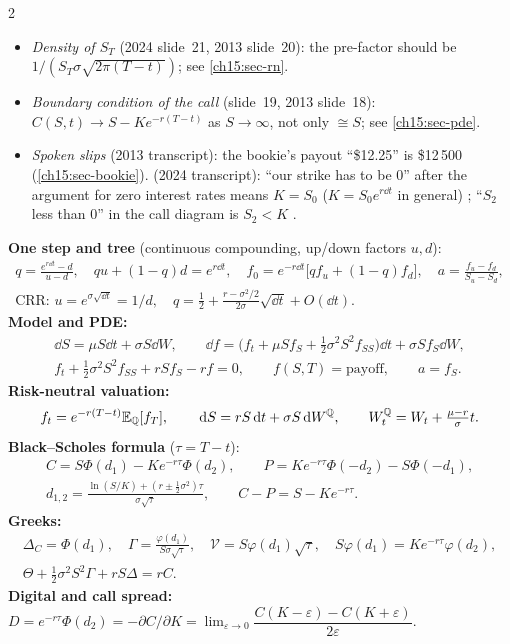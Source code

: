 \begin{paracol}{2}
\begin{coursenote}
\begin{itemize}
  \item \emph{Density of $S_T$} (2024 slide~21, 2013 slide~20): the pre-factor should be $1/(S_T\sigma\sqrt{2\pi(T-t)})$; see \cref{ch15:sec-rn}.
  \item \emph{Boundary condition of the call} (slide~19, 2013 slide~18): $C(S,t)\to S-Ke^{-r(T-t)}$ as $S\to\infty$, not only $\cong S$; see \cref{ch15:sec-pde}.
  \item \emph{Spoken slips} (2013 transcript): the bookie's payout ``\$12.25'' is \$12\,500 (\cref{ch15:sec-bookie}). (2024 transcript): ``our strike has to be 0'' after the argument for zero interest rates means $K=S_0$ ($K=S_0e^{r\dd t}$ in general) ;
        ``$S_2$ less than 0'' in the call diagram is $S_2<K$ .
\end{itemize}
\end{coursenote}

\begin{keyformulas}
\textbf{One step and tree} (continuous compounding, up/down factors $u,d$):
\begin{gather*}
  q=\frac{e^{r\dd t}-d}{u-d},\quad qu+(1-q)d=e^{r\dd t},\quad f_0=e^{-r\dd t}\bigl[qf_u+(1-q)f_d\bigr],\quad a=\frac{f_u-f_d}{S_u-S_d},\\
  \text{CRR: }u=e^{\sigma\sqrt{\dd t}}=1/d,\quad q=\tfrac12+\tfrac{r-\sigma^2/2}{2\sigma}\sqrt{\dd t}+O(\dd t).
\end{gather*}
\textbf{Model and PDE:}
\begin{gather*}
  \dd S=\mu S\dd t+\sigma S\dd W,\qquad \dd f=\bigl(f_t+\mu Sf_S+\tfrac12\sigma^2S^2f_{SS}\bigr)\dd t+\sigma Sf_S\dd W,\\
  f_t+\tfrac12\sigma^2S^2f_{SS}+rSf_S-rf=0,\qquad f(S,T)=\text{payoff},\qquad a=f_S .
\end{gather*}
\textbf{Risk-neutral valuation:}
\[
  f_t=e^{-r(T-t)}\mathbb{E}_{\mathbb{Q}}[f_T],\qquad \,\mathrm{d} S=rS\,\mathrm{d} t+\sigma S\,\mathrm{d} W^{\mathbb{Q}},\qquad W^{\mathbb{Q}}_t=W_t+\tfrac{\mu-r}{\sigma}t .
\]
\textbf{Black--Scholes formula} ($\tau=T-t$):
\begin{gather*}
  C=S\Phi(d_1)-Ke^{-r\tau}\Phi(d_2),\qquad P=Ke^{-r\tau}\Phi(-d_2)-S\Phi(-d_1),\\
  d_{1,2}=\frac{\ln(S/K)+(r\pm\frac12\sigma^2)\tau}{\sigma\sqrt\tau},\qquad C-P=S-Ke^{-r\tau}.
\end{gather*}
\textbf{Greeks:}
\begin{gather*}
  \Delta_C=\Phi(d_1),\quad\Gamma=\frac{\varphi(d_1)}{S\sigma\sqrt\tau},\quad\mathcal V=S\varphi(d_1)\sqrt\tau,\quad S\varphi(d_1)=Ke^{-r\tau}\varphi(d_2),\\
  \Theta+\tfrac12\sigma^2S^2\Gamma+rS\Delta=rC .
\end{gather*}
\textbf{Digital and call spread:} $D=e^{-r\tau}\Phi(d_2)=-\partial C/\partial K=\lim_{\varepsilon\to0}\dfrac{C(K-\varepsilon)-C(K+\varepsilon)}{2\varepsilon}$.
\end{keyformulas}


\end{paracol}
